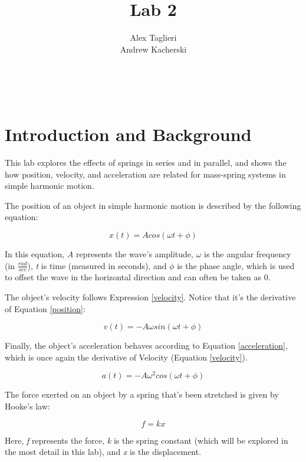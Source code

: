 \documentclass[]{article}
\title{Lab 2}
\author{
	Alex Taglieri
	\\
	Andrew Kacherski
	}
\begin{document}
\maketitle
\newpage
\
\raggedright


\section{Introduction and Background}

This lab explores the effects of springs in series and in parallel, and shows the how position, velocity, and acceleration are related for mass-spring systems in simple harmonic motion.

The position of an object in simple harmonic motion is described by the following equation:

\begin{equation}\label{position}
x(t)=Acos(\omega t + \phi)
\end{equation}

In this equation, \textit{A} represents the wave's amplitude, \textit{ $\omega $} is the angular frequency (in $ \frac{rad}{sec}$), \textit{t} is time (measured in seconds), and \textit{$ \phi $} is the phase angle, which is used to offset the wave in the horizontal direction and can often be taken as 0.

The object's velocity follows Expression \ref{velocity}. Notice that it's the derivative of Equation \ref{position}:

\begin{equation}\label{velocity}
v(t)=-A\omega sin(\omega t + \phi)
\end{equation}

Finally, the object's acceleration behaves according to Equation \ref{acceleration}, which is once again the derivative of Velocity (Equation \ref{velocity}).

\begin{equation}\label{acceleration}
a(t)=-A\omega^2 cos(\omega t + \phi)
\end{equation}

The force exerted on an object by a spring that's been stretched is given by Hooke's law:

\begin{equation}\label{fkx}
f=kx
\end{equation}

Here, \textit{f} represents the force, \textit{k} is the spring constant (which will be explored in the most detail in this lab), and \textit{x} is the displacement.
\end{document}
